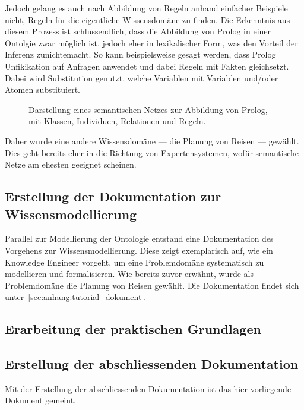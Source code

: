 Jedoch gelang es auch nach Abbildung von Regeln anhand einfacher Beispiele nicht, Regeln für die eigentliche Wissensdomäne zu finden. Die Erkenntnis aus diesem Prozess ist schlussendlich, dass die Abbildung von Prolog in einer Ontolgie zwar möglich ist, jedoch eher in lexikalischer Form, was den Vorteil der Inferenz zunichtemacht. So kann beispielsweise gesagt werden, dass Prolog Unfikikation auf Anfragen anwendet und dabei Regeln mit Fakten gleichsetzt. Dabei wird Substitution genutzt, welche Variablen mit Variablen und/oder Atomen substituiert.

\begin{figure}[H]
\centering {}
\caption{Darstellung eines semantischen Netzes zur Abbildung von Prolog, mit Klassen, Individuen, Relationen und Regeln.\label{fig:prolog_netz}\protect\footnotemark}
\end{figure}

Daher wurde eine andere Wissensdomäne --- die Planung von Reisen --- gewählt. Dies geht bereits eher in die Richtung von Expertensystemen, wofür semantische Netze am ehesten geeignet scheinen.

\subsection{Erstellung der Dokumentation zur Wissensmodellierung}
\label{subsec:dokumentation_wissensmodellierung}
Parallel zur Modellierung der Ontologie entstand eine Dokumentation des Vorgehens zur Wissensmodellierung. Diese zeigt exemplarisch auf, wie ein Knowledge Engineer vorgeht, um eine Problemdomäne systematisch zu modellieren und formalisieren. Wie bereits zuvor erwähnt, wurde als Problemdomäne die Planung von Reisen gewählt. Die Dokumentation findet sich unter~\autoref{sec:anhang:tutorial_dokument}.

\subsection{Erarbeitung der praktischen Grundlagen}
\label{subsec:praktische_grundlagen}

\subsection{Erstellung der abschliessenden Dokumentation}
\label{subsec:abschliessende_dokumentation}
Mit der Erstellung der abschliessenden Dokumentation ist das hier vorliegende Dokument gemeint.
